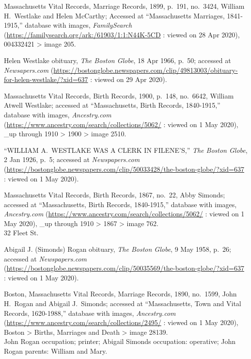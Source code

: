 \begin{thebibliography}{999}
	Massachusetts Vital Records, Marriage Records, 1899, p.\ 191, no.\ 3424, William H.\ Westlake and Helen McCarthy; Accessed at ``Massachusetts Marriages, 1841-1915,'' database with images, \textit{FamilySearch} (\url{https://familysearch.org/ark:/61903/1:1:N44K-5CD} : viewed on 28 Apr 2020), 004332421 > image 205.
	
	Helen Westlake obituary, \textit{The Boston Globe}, 18 Apr 1966, p.\ 50; accessed at \textit{Newsapers.com} (\url{https://bostonglobe.newspapers.com/clip/49813003/obituary-for-helen-westlake/?xid=637} : viewed on 29 Apr 2020).
	
	Massachusetts Vital Records, Birth Records, 1900, p.\ 148, no.\ 6642, William Atwell Westlake; accessed at ``Massachusetts, Birth Records, 1840-1915,'' database with images, \textit{Ancestry.com} (\url{https://www.ancestry.com/search/collections/5062/} : viewed on 1 May 2020), \_up through 1910 > 1900 > image 2510.	
	
	``WILLIAM A.\ WESTLAKE WAS A CLERK IN FILENE'S,'' \textit{The Boston Globe}, 2 Jan 1926, p.\ 5; accessed at \textit{Newspapers.com} (\url{https://bostonglobe.newspapers.com/clip/50033428/the-boston-globe/?xid=637} : viewed on 1 May 2020).

	Massachusetts Vital Records, Birth Records, 1867, no.\ 22, Abby Simonds; accessed at ``Massachusetts, Birth Records, 1840-1915,'' database with images, \textit{Ancestry.com} (\url{https://www.ancestry.com/search/collections/5062/} : viewed on 1 May 2020), \_up through 1910 > 1867 > image 762.\\
	32 Fleet St.
	
	Abigail J. (Simonds) Rogan obituary, \textit{The Boston Globe}, 9 May 1958, p.\ 26; accessed at \textit{Newspapers.com} (\url{https://bostonglobe.newspapers.com/clip/50035569/the-boston-globe/?xid=637} : viewed on 1 May 2020).
	
	Boston, Massachusetts Vital Records, Marriage Records, 1890, no.\ 1599, John H.\ Rogan and Abigail J.\ Simonds; accessed at ``Massachusetts, Town and Vital Records, 1620-1988,'' database with images, \textit{Ancestry.com} (\url{https://www.ancestry.com/search/collections/2495/} : viewed on 1 May 2020), Boston > Births, Marriages and Death > image 28139.\\
	John Rogan occupation; printer; Abigail Simonds occupation: operative; John Rogan parents: William and Mary.
	

\end{thebibliography}
